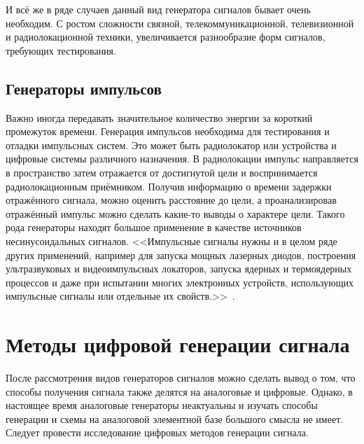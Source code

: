 	И всё же в ряде случаев данный вид генератора сигналов бывает очень необходим. С ростом сложности связной, телекоммуникационной, телевизионной и радиолокационной техники, увеличивается разнообразие форм сигналов, требующих тестирования.


\subsection{Генераторы импульсов}
	Важно иногда передавать значительное количество энергии за короткий промежуток времени. Генерация импульсов необходима для тестирования и отладки импульсных систем. Это может быть радиолокатор или устройства и цифровые системы различного назначения. В радиолокации импульс направляется в пространство затем отражается от достигнутой цели и воспринимается радиолокационным приёмником. Получив информацию о времени задержки отражённого сигнала, можно оценить расстояние до цели, а проанализировав отражённый импульс можно сделать какие-то выводы о характере цели. Такого рода генераторы находят большое применение в качестве источников несинусоидальных сигналов. <<Импульсные сигналы нужны и в целом ряде других применений, например для запуска мощных лазерных диодов, построения ультразвуковых и видеоимпульсных локаторов, запуска ядерных и термоядерных процессов и даже при испытании многих электронных устройств, использующих импульсные сигналы или отдельные их свойств.>>~\cite{dgs}.


\section{Методы цифровой генерации сигнала}

	После рассмотрения видов генераторов сигналов можно сделать вывод о том, что способы получения сигнала также делятся на аналоговые и цифровые. Однако, в настоящее время аналоговые генераторы неактуальны и изучать способы генерации и схемы на аналоговой элементной базе большого смысла не имеет. Следует провести исследование цифровых методов генерации сигнала. 
